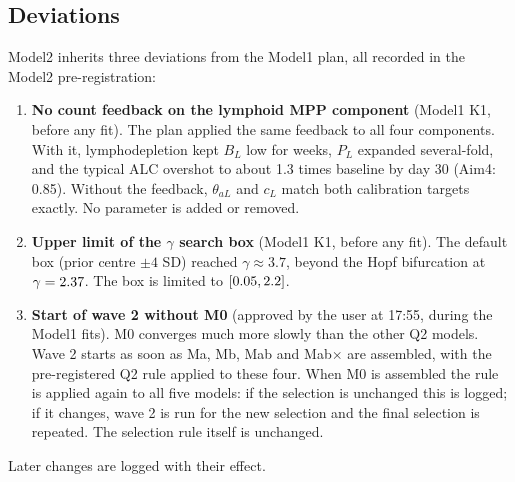 \documentclass[11pt]{article}
\begin{document}
\subsection{Deviations}\label{sec:deviations}
Model2 inherits three deviations from the Model1 plan, all recorded in the Model2 pre-registration:
\begin{enumerate}
\item \textbf{No count feedback on the lymphoid MPP component} (Model1 K1, before any fit). The plan applied the same feedback to all four components. With it, lymphodepletion kept $B_L$ low for weeks, $P_L$ expanded several-fold, and the typical ALC overshot to about 1.3 times baseline by day 30 (Aim4: 0.85). Without the feedback, $\theta_{aL}$ and $c_L$ match both calibration targets exactly. No parameter is added or removed.
\item \textbf{Upper limit of the $\gamma$ search box} (Model1 K1, before any fit). The default box (prior centre $\pm4$ SD) reached $\gamma\approx3.7$, beyond the Hopf bifurcation at $\gamma=2.37$. The box is limited to $[0.05,2.2]$.
\item \textbf{Start of wave 2 without M0} (approved by the user at 17:55, during the Model1 fits). M0 converges much more slowly than the other Q2 models. Wave 2 starts as soon as Ma, Mb, Mab and Mab$\times$ are assembled, with the pre-registered Q2 rule applied to these four. When M0 is assembled the rule is applied again to all five models: if the selection is unchanged this is logged; if it changes, wave 2 is run for the new selection and the final selection is repeated. The selection rule itself is unchanged.
\end{enumerate}
Later changes are logged with their effect.



\end{document}
